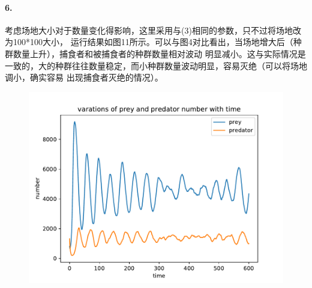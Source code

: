 \documentclass[a4paper]{ctexart}
\begin{document}
	\paragraph{6.}考虑场地大小对于数量变化得影响，这里采用与(3)相同的参数，只不过将场地改为100*100大小，
	运行结果如图11所示。可以与图4对比看出，当场地增大后（种群数量上升），捕食者和被捕食者的种群数量相对波动
	明显减小。这与实际情况是一致的，大的种群往往数量稳定，而小种群数量波动明显，容易灭绝（可以将场地调小，确实容易
	出现捕食者灭绝的情况）。
	\begin{figure}[htbp]
		\centering 
		\includegraphics[scale=0.6]{demo10.pdf}
		\caption{}
	\end{figure}
\end{document}
